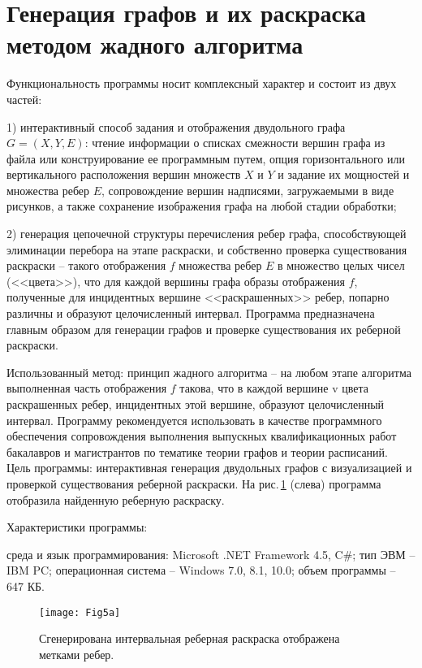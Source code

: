 \section{Генерация графов и их раскраска методом жадного алгоритма}
Функциональность программы \cite{akm-prog5} носит комплексный характер и состоит из двух частей:

1) интерактивный способ задания и отображения двудольного графа $G=(X,Y,E)$: чтение информации о списках смежности вершин графа из файла или конструирование ее программным путем, опция горизонтального или вертикального расположения вершин множеств $X$ и $Y$ и задание их мощностей и множества ребер $E$, сопровождение вершин надписями, загружаемыми в виде рисунков, а также сохранение изображения графа на любой стадии обработки;

2) генерация цепочечной структуры перечисления ребер графа, способствующей элиминации перебора на этапе раскраски, и собственно проверка существования раскраски – такого отображения $f$ множества ребер $E$ в множество целых
чисел (<<цвета>>), что для каждой вершины графа образы отображения $f$, полученные для инцидентных вершине <<раскрашенных>> ребер, попарно различны и образуют целочисленный интервал.
Программа предназначена главным образом для генерации графов и проверке существования их реберной раскраски.

Использованный метод: принцип жадного алгоритма – на любом этапе алгоритма выполненная часть отображения $f$ такова, что в каждой вершине v цвета раскрашенных ребер, инцидентных этой вершине, образуют целочисленный интервал.
Программу рекомендуется использовать в качестве программного обеспечения сопровождения выполнения выпускных квалификационных работ бакалавров и магистрантов по тематике теории графов и теории расписаний.
Цель программы: интерактивная генерация двудольных графов с визуализацией и проверкой существования реберной раскраски. На рис.\,\ref{MAM_Fig5a} (слева) программа отобразила найденную реберную раскраску.


Характеристики программы:

среда и язык программирования: Microsoft .NET Framework 4.5, C\#;
тип ЭВМ – IBM PC;
операционная система – Windows 7.0, 8.1, 10.0;
объем программы – 647 КБ.

\begin{figure}[h]
  \texttt{[image: Fig5a]}
  \caption{Сгенерирована интервальная реберная раскраска отображена метками ребер.}\label{MAM_Fig5a}
\end{figure}

